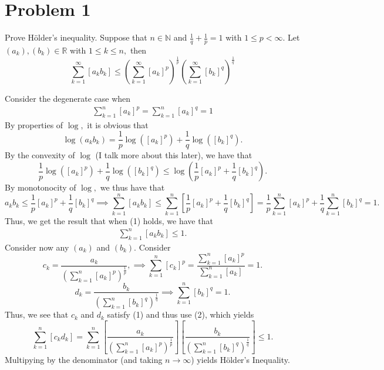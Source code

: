 \documentclass[11pt]{article}
\newcommand{\bbN}{\mathbb{N}}
\newcommand{\bbR}{\mathbb{R}}
\begin{document}
	
	
	\psetheader

\section*{Problem 1}
\begin{problem}
    Prove H\"{o}lder's inequality. Suppose that $n \in \bbN$ and $\frac{1}{q} + \frac{1}{p} = 1$ with $1 \leq p < \infty.$ Let $(a_k), (b_k)\in \bbR$ with $1\leq k \leq n,$ then 
    \[\sum_{k=1}^\infty [a_k b_k] \leq \left(\sum_{k=1}^\infty [a_k]^{p}\right)^\frac{1}{p}\left(\sum_{k=1}^\infty [b_k]^{q}\right)^\frac{1}{q}\]
\end{problem}
\begin{solution}
    Consider the degenerate case when 
    \begin{align}
      \sum_{k=1}^n [a_k]^p  = \sum_{k=1}^n [a_k]^q = 1  
    \end{align}
    By properties of $\log,$ it is obvious that 
    \[\log(a_k b_k)  = \frac{1}{p}\log([a_k]^p) + \frac{1}{q}\log([b_k]^q).\] By the convexity of $\log$ (I talk more about this later), we have that 
    \[\frac{1}{p}\log([a_k]^p) + \frac{1}{q}\log([b_k]^q) \leq \log(\frac{1}{p}[a_k]^p + \frac{1}{q}[b_k]^q).\] By monotonocity of $\log,$ we thus have that 
    \[a_kb_k \leq \frac{1}{p}[a_k]^p + \frac{1}{q}[b_k]^q \implies \sum_{k=1}^n[a_k b_k] \leq \sum_{k=1}^n\left[\frac{1}{p}[a_k]^p + \frac{1}{q}[b_k]^q\right] = \frac{1}{p}\sum_{k=1}^n [a_k]^p + \frac{1}{q}\sum_{k=1}^n[b_k]^q = 1.\] Thus, we get the result that when (1) holds, we have that 
    \begin{align}
    \sum_{k=1}^n[a_k b_k] \leq 1.    
    \end{align}
     Consider now any $(a_k)$ and $(b_k).$ Consider 
    \[c_k = \frac{a_k}{\left(\sum_{k=1}^n [a_k]^p\right)^{\frac{1}{p}}}, \implies \sum_{k=1}^n [c_k]^p = \frac{\sum_{k=1}^n [a_k]^p}{\sum_{k=1}^n[a_k]} = 1.\] 
    \[d_k = \frac{b_k}{\left(\sum_{k=1}^n [b_k]^q\right)^{\frac{1}{q}}} \implies \sum_{k=1}^n [b_k]^q = 1.\]
    Thus, we see that $c_k$ and $d_k$ satisfy (1) and thus use (2), which yields
    \[\sum_{k=1}^n [c_k d_k] = \sum_{k=1}^n \left[\frac{a_k}{\left(\sum_{k=1}^n [a_k]^p\right)^{\frac{1}{p}}}\right]\left[\frac{b_k}{\left(\sum_{k=1}^n [b_k]^q\right)^{\frac{1}{q}}}\right] \leq 1.\] Multipying by the denominator (and taking $n\to \infty$) yields H\"{o}lder's Inequality.


\end{solution}
\end{document}
